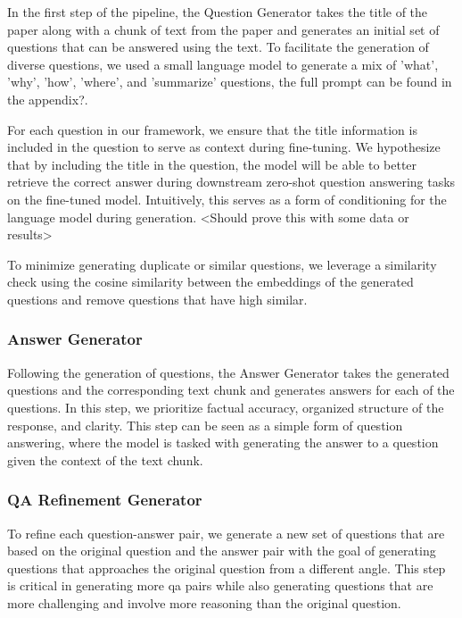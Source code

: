 In the first step of the pipeline, the Question Generator takes the title of the paper along with a chunk of text from the paper
and generates an initial set of questions that can be answered using the text. To facilitate the generation of diverse questions,
we used a small language model to generate a mix of 'what', 'why', 'how', 'where', and 'summarize' questions, the full prompt can be found in the appendix?.

For each question in our framework, we ensure that the title information is included in the question to serve as context during fine-tuning. We hypothesize
that by including the title in the question, the model will be able to better retrieve the correct answer during downstream zero-shot question answering tasks on the fine-tuned
model. Intuitively, this serves as a form of conditioning for the language model during generation. <Should prove this with some data or results>

To minimize generating duplicate or similar questions, we leverage a similarity check using the cosine similarity between the embeddings of the generated questions
and remove questions that have high similar.

\subsubsection{Answer Generator}

Following the generation of questions, the Answer Generator takes the generated questions and the corresponding text chunk and generates answers for each of the questions.
In this step, we prioritize factual accuracy, organized structure of the response, and clarity. This step can be seen as a simple form of question answering, where the model is
tasked with generating the answer to a question given the context of the text chunk.

\subsubsection{QA Refinement Generator}

To refine each question-answer pair, we generate a new set of questions that are based on the original question and the answer pair
with the goal of generating questions that approaches the original question from a different angle. This step is critical in
generating more qa pairs while also generating questions that are more challenging and involve more reasoning than the original question.

